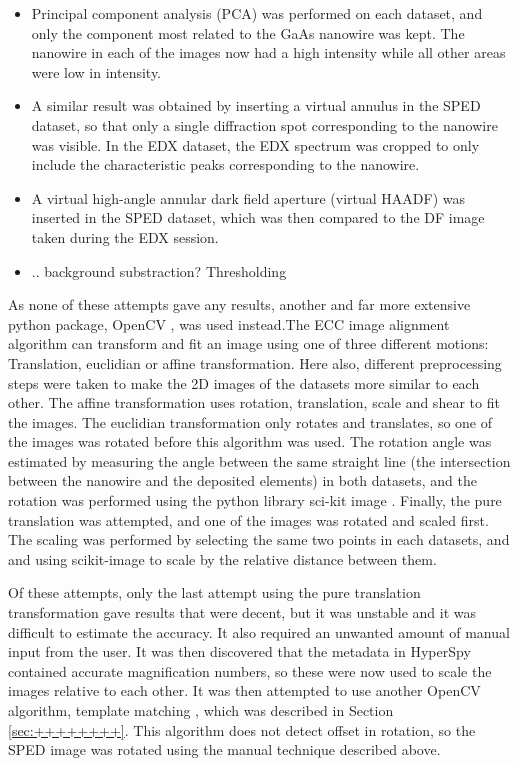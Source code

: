 \begin{itemize}
\item Principal component analysis (PCA) was performed on each dataset, and only the component most related to the GaAs nanowire was kept. The nanowire in each of the images now had a high intensity while all other areas were low in intensity.
\item A similar result was obtained by inserting a virtual annulus in the SPED dataset, so that only a single diffraction spot corresponding to the nanowire was visible. In the EDX dataset, the EDX spectrum was cropped to only include the characteristic peaks corresponding to the nanowire.
\item A virtual high-angle annular dark field aperture (virtual HAADF) was inserted in the SPED dataset, which was then compared to the DF image taken during the EDX session.
\item .. background substraction? Thresholding
\end{itemize}

As none of these attempts gave any results, another and far more extensive python package, OpenCV \cite{open-cv}, was used instead.The ECC image alignment algorithm \cite{open-cv-ECC} can transform and fit an image using one of three different motions: Translation, euclidian or affine transformation. Here also, different preprocessing steps were taken to make the 2D images of the datasets more similar to each other. The affine transformation uses rotation, translation, scale and shear to fit the images. The euclidian transformation only rotates and translates, so one of the images was rotated before this algorithm was used. The rotation angle was estimated by measuring the angle between the same straight line (the intersection between the nanowire and the deposited elements) in both datasets, and the rotation was performed using the python library sci-kit image \cite{scikit-image}. Finally, the pure translation was attempted, and one of the images was rotated and scaled first. The scaling was performed by selecting the same two points in each datasets, and and using scikit-image to scale by the relative distance between them.

Of these attempts, only the last attempt using the pure translation transformation gave results that were decent, but it was unstable and it was difficult to estimate the accuracy. It also required an unwanted amount of manual input from the user. It was then discovered that the metadata in HyperSpy contained accurate magnification numbers, so these were now used to scale the images relative to each other. It was then attempted to use another OpenCV algorithm, template matching \cite{open-cv-template-matching}, which was described in Section \ref{sec:++++++++}. This algorithm does not detect offset in rotation, so the SPED image was rotated using the manual technique described above.

